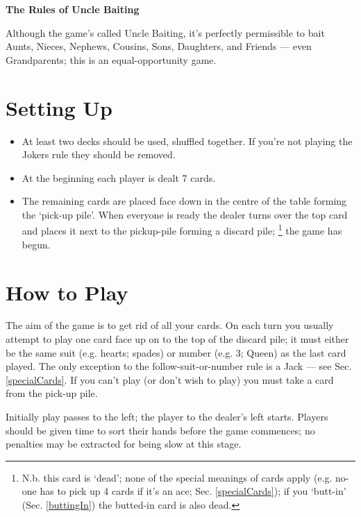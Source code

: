 \documentclass[12pt]{article}
\newcommand{\Sec}[1]{Sec. \ref{#1}}
\begin{document}
\begin{center}
  \textbf{\Large The Rules of Uncle Baiting}
\end{center}

Although the game's called Uncle Baiting, it's perfectly permissible to bait Aunts, Nieces, Nephews,
Cousins, Sons, Daughters, and Friends --- even Grandparents;  this is an equal-opportunity game.

\section{Setting Up}

\begin{itemize}
\item At least two decks should be used, shuffled together.  If you're not playing the Jokers rule they should
  be removed.
  
\item At the beginning each player is dealt 7 cards.
  
\item The remaining cards are placed face down in the centre of the table forming the `pick-up pile'.
  When everyone is ready the dealer turns over the 
  top card and places it next to the pickup-pile forming a discard pile;%
\footnote{N.b. this card is `dead'; none of the special meanings of cards apply (e.g.
no-one has to pick up 4 cards if it's an ace; \Sec{specialCards}); if you 
`butt-in' (\Sec{buttingIn}) the butted-in card is also dead.}
the game has begun.

\end{itemize}

\section{How to Play}

The aim of the game is to get rid of all your cards.  On each turn you usually attempt to play one card face up on to
the top of the discard pile; it must either be the same suit (e.g. hearts; spades) or number (e.g.  3; Queen) as the
last card played.  The only exception to the follow-suit-or-number rule is a Jack --- see \Sec{specialCards}.  If you
can't play (or don't wish to play) you must take a card from the pick-up pile.

Initially play passes to the left; the player to the dealer's left starts.
Players should be given time to sort their hands before the game commences; no
penalties may be extracted for being slow at this stage.
\end{document}
